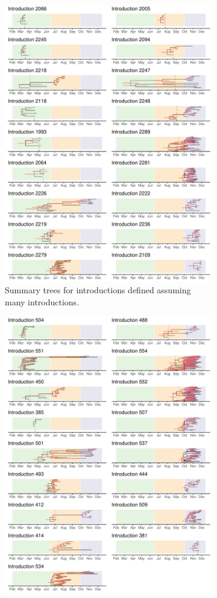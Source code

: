 \documentclass[9pt,twoside,lineno]{pnas-new}
\begin{document}
\begin{landscape}
\begin{figure}[H]
\centering
\begin{subfigure}[b]{0.65\textwidth}
\centering
\includegraphics[width=0.75\linewidth]{figures/Re_skyline.max_chains.sampUB1.0.ctEst1.summary_trees.pdf}
\caption{Summary trees for introductions defined assuming many introductions.}
\end{subfigure}
\begin{subfigure}[b]{0.65\textwidth}
\centering
\includegraphics[width=0.75\linewidth]{figures/Re_skyline.min_chains.sampUB1.0.ctEst1.summary_trees.pdf}

\end{subfigure}
\end{figure}
\end{landscape}
\end{document}
